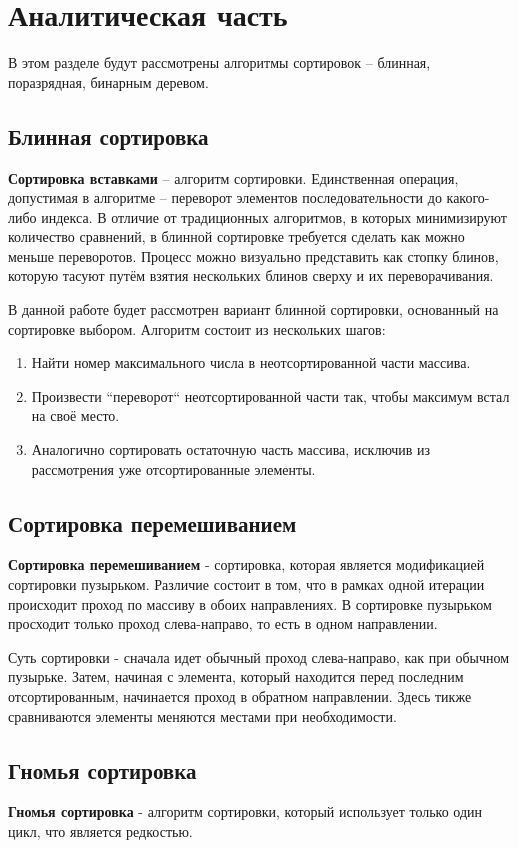 \chapter{Аналитическая часть}
В этом разделе будут рассмотрены алгоритмы сортировок -- блинная, поразрядная, бинарным деревом.

\section{Блинная сортировка}
\textbf{Сортировка вставками} \cite{pancake-sort} -- алгоритм сортировки.
Единственная операция, допустимая в алгоритме -- переворот элементов последовательности до какого-либо индекса. В отличие от традиционных алгоритмов, в которых минимизируют количество сравнений, в блинной сортировке требуется сделать как можно меньше переворотов. Процесс можно визуально представить как стопку блинов, которую тасуют путём взятия нескольких блинов сверху и их переворачивания.

В данной работе будет рассмотрен вариант блинной сортировки, основанный на сортировке выбором.
Алгоритм состоит из нескольких шагов:
\begin{enumerate}
	\item Найти номер максимального числа в неотсортированной части массива.
	\item Произвести ``переворот`` неотсортированной части так, чтобы максимум встал на своё место.
	\item Аналогично сортировать остаточную часть массива, исключив из рассмотрения уже отсортированные элементы.
\end{enumerate}

\section{Сортировка перемешиванием}
\textbf{Сортировка перемешиванием} \cite{sheyker-sort} - сортировка, которая является модификацией сортировки пузырьком. Различие состоит в том, что в рамках одной итерации происходит проход по массиву в обоих направлениях. В сортировке пузырьком просходит только проход слева-направо, то есть в одном направлении.

Суть сортировки - сначала идет обычный проход слева-направо, как при обычном пузырьке. Затем, начиная с элемента, который находится перед последним отсортированным, начинается проход в обратном направлении. Здесь тикже сравниваются элементы меняются местами при необходимости.


\section{Гномья сортировка}
\textbf{Гномья сортировка} \cite{gnomme-sort} - алгоритм сортировки, который использует только один цикл, что является редкостью.

